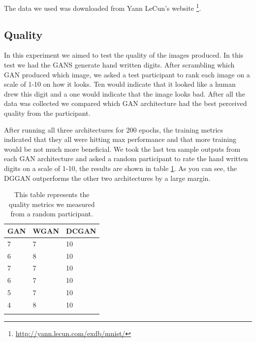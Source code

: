 \documentclass[12pt,
 reprint,
nofootinbib,
 amsmath,amssymb,
 aps,
floatfix,
]{revtex4-2}
\begin{document}
The data we used was downloaded from Yann LeCun's website \footnote{\url{http://yann.lecun.com/exdb/mnist/}}.


\subsection{\label{sec:expQuality}Quality}

In this experiment we aimed to test the quality of the images produced. In this test we had the GANS generate hand written digits. After scrambling which GAN produced which image, we asked a test participant to rank each image on a scale of 1-10 on how it looks. Ten would indicate that it looked like a human drew this digit and a one would indicate that the image looks bad. After all the data was collected we compared which GAN architecture had the best perceived quality from the participant. 

After running all three architectures for 200 epochs, the training metrics indicated that they all were hitting max performance and that more training would be not much more beneficial. We took the last ten sample outputs from each GAN architecture and asked a random participant to rate the hand written digits on a scale of 1-10, the results are shown in table \ref{tab:quality}. As you can see, the DGGAN outperforms the other two architectures by a large margin. 

\begin{table}[]
\caption{\label{tab:quality}This table represents the quality metrics we measured from a random participant. }
\begin{tabular}{lll}
\hline
\multicolumn{1}{|l|}{GAN} & \multicolumn{1}{l|}{WGAN} & \multicolumn{1}{l|}{DCGAN} \\ \hline
\multicolumn{1}{|l|}{7}   & \multicolumn{1}{l|}{7}    & \multicolumn{1}{l|}{10}    \\
\multicolumn{1}{|l|}{6}   & \multicolumn{1}{l|}{8}    & \multicolumn{1}{l|}{10}    \\
\multicolumn{1}{|l|}{7}   & \multicolumn{1}{l|}{7}    & \multicolumn{1}{l|}{10}    \\
\multicolumn{1}{|l|}{6}   & \multicolumn{1}{l|}{7}    & \multicolumn{1}{l|}{10}    \\
\multicolumn{1}{|l|}{5}   & \multicolumn{1}{l|}{7}    & \multicolumn{1}{l|}{10}    \\
\multicolumn{1}{|l|}{4}   & \multicolumn{1}{l|}{8}    & \multicolumn{1}{l|}{10}    \\ \hline
                          &                           &                           
\end{tabular}
\end{table}
\end{document}
